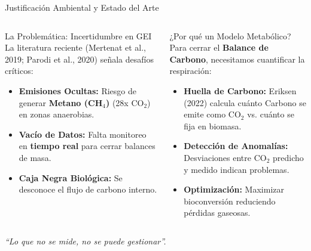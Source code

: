 \documentclass[aspectratio=169, 10pt]{beamer}
\begin{document}
\begin{frame}{Justificación Ambiental y Estado del Arte}
    \begin{columns}[T]
        \vspace{-0.5cm}
        \begin{alertblock}{La Problemática: Incertidumbre en GEI}
            La literatura reciente (Mertenat et al., 2019; Parodi et al., 2020) señala desafíos críticos:
            \vspace{0.3em}
            \begin{itemize}
                \item \textbf{Emisiones Ocultas:} Riesgo de generar \textbf{Metano (CH$_4$)} (28x CO$_2$) en zonas anaerobias.
                \item \textbf{Vacío de Datos:} Falta monitoreo en \textbf{tiempo real} para cerrar balances de masa.
                \item \textbf{Caja Negra Biológica:} Se desconoce el flujo de carbono interno.
            \end{itemize}
        \end{alertblock}

        \vspace{-0.25cm}
        \begin{exampleblock}{¿Por qué un Modelo Metabólico?}
            Para cerrar el \textbf{Balance de Carbono}, necesitamos cuantificar la respiración:
            \vspace{0.3em}
            \begin{itemize}
                \item \textbf{Huella de Carbono:} Eriksen (2022) calcula cuánto Carbono se emite como CO$_2$ vs. cuánto se fija en biomasa.
                \item \textbf{Detección de Anomalías:} Desviaciones entre CO$_2$ predicho y medido indican problemas.
                \item \textbf{Optimización:} Maximizar bioconversión reduciendo pérdidas gaseosas.
            \end{itemize}
        \end{exampleblock}
    \end{columns}
    \vspace{0.5cm}
    \centering
    \small \textit{``Lo que no se mide, no se puede gestionar''.}
\end{frame}
\end{document}
